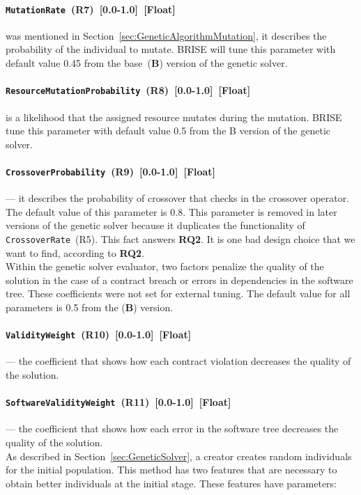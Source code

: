 \paragraph{\texttt{MutationRate}~(R7)~[0.0-1.0]~[Float]} was mentioned in Section~\ref{sec:GeneticAlgorithmMutation}, it describes the probability of the individual to mutate. BRISE will tune this parameter with default value 0.45 from the base~(\textbf{B}) version of the genetic solver.
\paragraph{\texttt{ResourceMutationProbability}~(R8)~[0.0-1.0]~[Float]} is a likelihood that the assigned resource mutates during the mutation. BRISE tune this parameter with default value 0.5 from the B version of the genetic solver.
\paragraph{\texttt{CrossoverProbability}~(R9)~[0.0-1.0]~[Float]} — it describes the probability of crossover that checks in the crossover operator. The default value of this parameter is 0.8. This parameter is removed in later versions of the genetic solver because it duplicates the functionality of \texttt{CrossoverRate}~(R5). This fact answers \textbf{RQ2}. It is one bad design choice that we want to find, according to \textbf{RQ2}.\\ 


Within the genetic solver evaluator, two factors penalize the quality of the solution in the case of a contract breach or errors in dependencies in the software tree. These coefficients were not set for external tuning. The default value for all parameters is 0.5 from the (\textbf{B}) version.
\paragraph{\texttt{ValidityWeight}~(R10)~[0.0-1.0]~[Float]} — the coefficient that shows how each contract violation decreases the quality of the solution.
\paragraph{\texttt{SoftwareValidityWeight}~(R11)~[0.0-1.0]~[Float]} — the coefficient that shows how each error in the software tree decreases the quality of the solution.\\

As described in Section~\ref{sec:GeneticSolver}, a creator creates random individuals for the initial population.
This method has two features that are necessary to obtain better individuals at the initial stage. These features have parameters:
